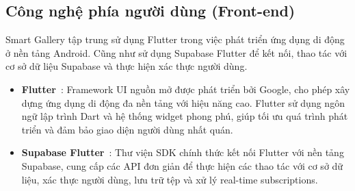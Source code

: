 \subsection{Công nghệ phía người dùng (Front-end)}

Smart Gallery tập trung sử dụng Flutter trong việc phát triển ứng dụng di động ở nền tảng Android. Cũng như sử dụng Supabase Flutter để kết nối, thao tác với cơ sở dữ liệu Supabase và thực hiện xác thực người dùng.

\begin{itemize}
    \item \textbf{Flutter}~\cite{flutterdoc}: Framework UI nguồn mở được phát triển bởi Google, cho phép xây dựng ứng dụng di động đa nền tảng với hiệu năng cao. Flutter sử dụng ngôn ngữ lập trình Dart và hệ thống widget phong phú, giúp tối ưu quá trình phát triển và đảm bảo giao diện người dùng nhất quán. 
    
    \item \textbf{Supabase Flutter}~\cite{supabaseflutterdoc}: Thư viện SDK chính thức kết nối Flutter với nền tảng Supabase, cung cấp các API đơn giản để thực hiện các thao tác với cơ sở dữ liệu, xác thực người dùng, lưu trữ tệp và xử lý real-time subscriptions.
\end{itemize}
